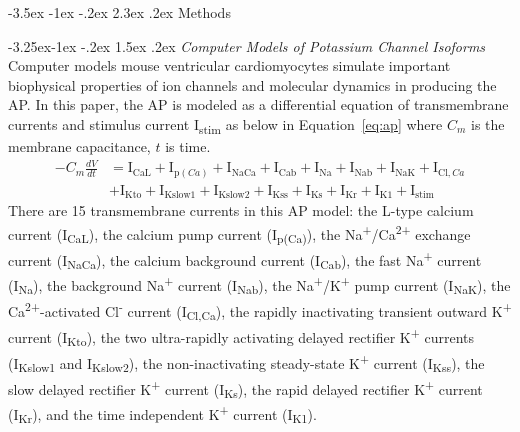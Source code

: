 \documentclass[11pt]{article}
\makeatletter
\renewcommand\section{\@startsection {section}{1}{\z@}%
                                   {-3.5ex \@plus -1ex \@minus -.2ex}%
                                   {2.3ex \@plus.2ex}%
                                   {\normalfont\fontfamily{phv}\fontsize{16}{19}\bfseries}}
\renewcommand\subsection{\@startsection{subsection}{2}{\z@}%
                                     {-3.25ex\@plus -1ex \@minus -.2ex}%
                                     {1.5ex \@plus .2ex}%
                                     {\normalfont\fontfamily{phv}\fontsize{14}{17}\bfseries}}
\makeatother
\begin{document}
\section{Methods} \label{s:methods}

\subsection{\emph{Computer Models of Potassium Channel Isoforms}} \label{s:methods.1}
Computer models mouse ventricular cardiomyocytes simulate important biophysical properties of ion channels and molecular dynamics in producing the AP. In this paper, the AP is modeled as a differential equation of transmembrane currents and stimulus current I\textsubscript{stim} as below in Equation~\ref{eq:ap} where $C_{m}$ is the membrane capacitance, $t$ is time.
\begin{equation}
    \label{eq:ap}
    \begin{split}
    -C_{m}\frac{dV}{dt} &= \mathrm{I}_{\mathrm{CaL}}+\mathrm{I}_{\mathrm{p}(Ca)}+\mathrm{I}_{\mathrm{NaCa}}+\mathrm{I}_{\mathrm{Cab}}+\mathrm{I}_{\mathrm{Na}}+\mathrm{I}_{\mathrm{Nab}}+\mathrm{I}_{\mathrm{NaK}}+\mathrm{I}_{\mathrm{Cl},Ca} \\
    &+\mathrm{I}_{\mathrm{Kto}}+\mathrm{I}_{\mathrm{Kslow1}}+\mathrm{I}_{\mathrm{Kslow2}}+\mathrm{I}_{\mathrm{Kss}}+\mathrm{I}_{\mathrm{Ks}}+\mathrm{I}_{\mathrm{Kr}}+\mathrm{I}_{\mathrm{K1}}+\mathrm{I}_{\mathrm{stim}}
    \end{split}
\end{equation}
There are 15 transmembrane currents in this AP model: the L-type calcium current (I\textsubscript{CaL}), the calcium pump current (I\textsubscript{p(Ca)}), the Na\textsuperscript{+}/Ca\textsuperscript{2+} exchange current (I\textsubscript{NaCa}), the calcium background current (I\textsubscript{Cab}), the fast Na\textsuperscript{+} current (I\textsubscript{Na}), the background Na\textsuperscript{+} current (I\textsubscript{Nab}), the Na\textsuperscript{+}/K\textsuperscript{+} pump current (I\textsubscript{NaK}), the Ca\textsuperscript{2+}-activated Cl\textsuperscript{-} current (I\textsubscript{Cl,Ca}), the rapidly inactivating transient outward K\textsuperscript{+} current (I\textsubscript{Kto}), the two ultra-rapidly activating delayed rectifier K\textsuperscript{+} currents (I\textsubscript{Kslow1} and I\textsubscript{Kslow2}), the non-inactivating steady-state K\textsuperscript{+} current (I\textsubscript{Kss}), the slow delayed rectifier K\textsuperscript{+} current (I\textsubscript{Ks}), the rapid delayed rectifier K\textsuperscript{+} current (I\textsubscript{Kr}), and the time independent K\textsuperscript{+} current (I\textsubscript{K1}).
\end{document}
